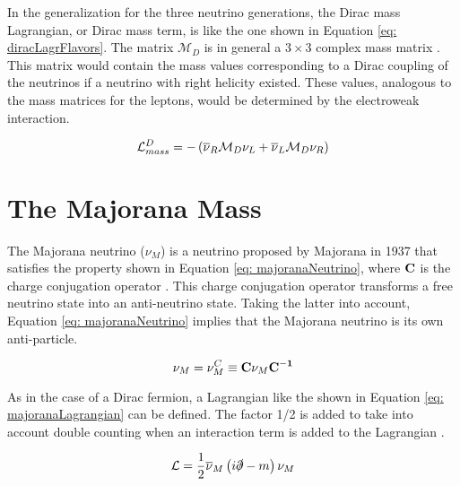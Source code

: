 In the generalization for the three neutrino generations, the Dirac mass Lagrangian, or Dirac mass term, is like the one shown in Equation \ref{eq: diracLagrFlavors}. The matrix $\mathcal{M}_{D}$ is in general a $3 \times 3$ complex mass matrix \cite{NeutrinoMass}. This matrix would contain the mass values corresponding to a Dirac coupling of the neutrinos if a neutrino with right helicity existed. These values, analogous to the mass matrices for the leptons, would be determined by the electroweak interaction. 

\begin{equation}\label{eq: diracLagrFlavors}
\mathcal{L}_{mass}^{D} = -\left(\overline{\nu}_{R}\mathcal{M}_{D}\nu_{L} + \overline{\nu}_{L}\mathcal{M}_{D}\nu_{R}\right)
\end{equation}


\section{The Majorana Mass}

The Majorana neutrino ($\nu_{M}$) is a neutrino proposed by Majorana in 1937 that satisfies the property shown in Equation \ref{eq: majoranaNeutrino}, where $\mathbf{C}$ is the charge conjugation operator \cite{NeutrinoMass}. This charge conjugation operator transforms a free neutrino state into an anti-neutrino state. Taking the latter into account, Equation \ref{eq: majoranaNeutrino} implies that the Majorana neutrino is its own anti-particle. 

\begin{equation}\label{eq: majoranaNeutrino}
\nu_{M} = \nu^{C}_{M} \equiv \mathbf{C}\nu_{M}\mathbf{C^{-1}}
\end{equation}

As in the case of a Dirac fermion, a Lagrangian like the shown in Equation \ref{eq: majoranaLagrangian} can be defined. The factor 1/2 is added to take into account double counting when an interaction term is added to the Lagrangian \cite{NeutrinoMass}.   

\begin{equation}\label{eq: majoranaLagrangian}
\mathcal{L} = \frac{1}{2}\overline{\nu}_{M}\left(i\slashed{\partial} - m\right)\nu_{M}
\end{equation}

